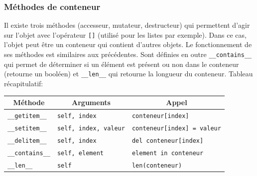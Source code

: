 \documentclass[a4paper, 10pt]{article}
\newcommand{\code}[1]{{\small\texttt{#1}}}
\begin{document}
\subsubsection{Méthodes de conteneur}
Il existe trois méthodes (accesseur, mutateur, destructeur) qui permettent d'agir sur l'objet avec l'opérateur \code{[]} (utilisé pour les listes par exemple). Dans ce cas, l'objet peut être un conteneur qui contient d'autres objets. Le fonctionnement de ses méthodes est similaires aux précédentes. Sont définies en outre \code{\_\_contains\_\_}\index{\code{\_\_contains\_\_}} qui permet de déterminer si un élément est présent ou non dans le conteneur (retourne un booléen) et \code{\_\_len\_\_}\index{\code{\_\_len\_\_}} qui retourne la longueur du conteneur. Tableau récapitulatif:
\begin{center}
        \begin{tabular}{|p{2.5cm}|p{3.5 cm}|p{5cm}|}
        \hline
        \multicolumn{1}{|c}{\bf Méthode} & \multicolumn{1}{|c}{\bf Arguments} & \multicolumn{1}{|c|}{\bf Appel} \\
        \hline
        \code{\_\_getitem\_\_} & \code{self, index} & \code{conteneur[index]}\\
        \hline
        \code{\_\_setitem\_\_} & \code{self, index, valeur} & \code{conteneur[index] = valeur}\\
        \hline
        \code{\_\_delitem\_\_} & \code{self, index} & \code{del conteneur[index]}\\
        \hline
        \code{\_\_contains\_\_} & \code{self, element} & \code{element in conteneur}\\
        \hline
        \code{\_\_len\_\_} & \code{self} & \code{len(conteneur)}\\
        \hline
\end{tabular}
\end{center}
\end{document}
